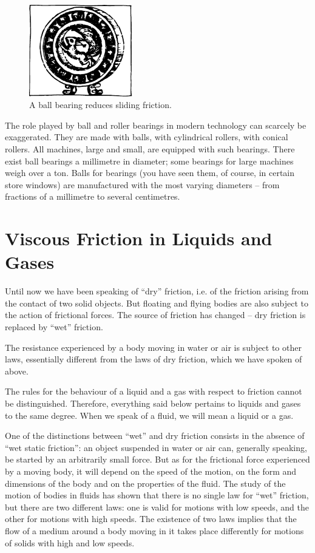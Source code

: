 \begin{figure}[!ht]
\centering
\includegraphics[width=0.4\textwidth]{figures/fig-06-02.pdf}
\caption{A ball bearing reduces sliding friction.}
\label{fig-6.2}
\end{figure}

The role played by ball and roller bearings in modern technology can scarcely be exaggerated. They are made with balls, with cylindrical rollers, with conical rollers. All machines, large and small, are equipped with such bearings. There exist ball bearings a millimetre in diam­eter; some bearings for large machines weigh over a ton. Balls for bearings (you have seen them, of course, in certain store windows) are manufactured with the most varying diameters -- from fractions of a millimetre to several centimetres.


\section{Viscous Friction in Liquids and Gases}

Until now we have been speaking of ``dry'' friction, i.e. of the friction arising from the contact of two solid objects. But floating and flying bodies are also subject to the action of frictional forces. The source of friction has changed -- dry friction is replaced by ``wet'' friction.

The resistance experienced by a body moving in water or air is subject to other laws, essentially different from the laws of dry friction, which we have spoken of above.

The rules for the behaviour of a liquid and a gas with respect to friction cannot be distinguished. Therefore, everything said below pertains to liquids and gases to the same degree. When we speak of a fluid, we will mean a liquid or a gas.

One of the distinctions between ``wet'' and dry friction consists in the absence of ``wet static friction'': an object suspended in water or air can, generally speaking, be started by an arbitrarily small force. But as for the fric­tional force experienced by a moving body, it will depend on the speed of the motion, on the form and dimensions of the body and on the properties of the fluid. The study of the motion of bodies in fluids has shown that there is no single law for ``wet'' friction, but there are two different laws: one is valid for motions with low speeds, and the other for motions with high speeds. The existence of two laws implies that the flow of a medium around a body moving in it takes place differently for motions of solids with high and low speeds.

